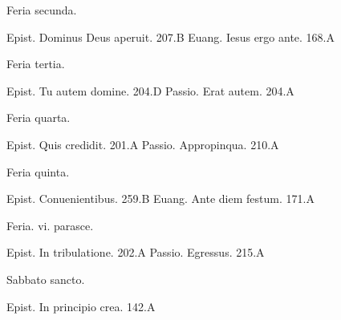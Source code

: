 \documentclass[a5paper,10pt]{book}
\begin{document}
\begin{multicols}{2}
\begin{center}
\color{red} Feria secunda.
\end{center}
\vspace{-.75em}
\par \noindent Epist. Dominus Deus aperuit. \hfill 207.B
\newline Euang. Iesus ergo ante. \hfill 168.A
\newline \vspace{-1.75em}
\begin{center}
\color{red} Feria tertia.
\end{center}
\vspace{-.75em}
\par \noindent Epist. Tu autem domine. \hfill 204.D
\newline Passio. Erat autem. \hfill 204.A
\newline \vspace{-1.75em}
\begin{center}
\color{red} Feria quarta.
\end{center}
\vspace{-.75em}
\par \noindent Epist. Quis credidit. \hfill 201.A
\newline Passio. Appropinqua. \hfill 210.A
\newline \vspace{-1.75em}
\begin{center}
\color{red} Feria quinta.
\end{center}
\vspace{-.75em}
\par \noindent Epist. Conuenientibus. \hfill 259.B
\newline Euang. Ante diem festum. \hfill 171.A
\newline \vspace{-1.75em}
\begin{center}
\color{red} Feria. vi. parasce.
\end{center}
\vspace{-.75em}
\par \noindent Epist. In tribulatione. \hfill 202.A
\newline Passio. Egressus. \hfill 215.A
\newline \vspace{-1.75em}
\begin{center}
\color{red} Sabbato sancto.
\end{center}
\vspace{-.75em}
\par \noindent Epist. In principio crea. \hfill 142.A

\end{multicols}
\end{document}
